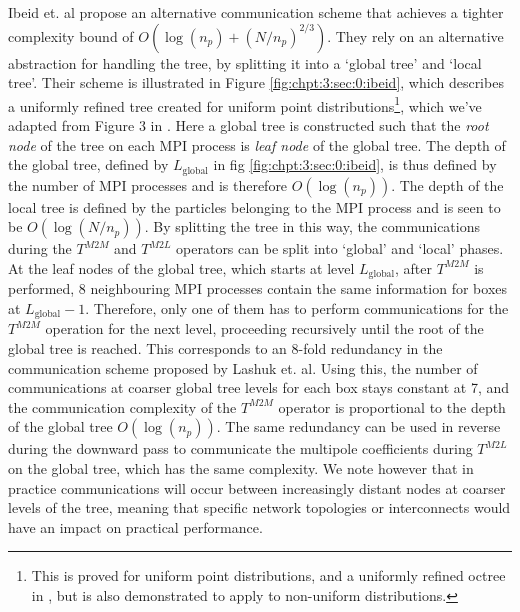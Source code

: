 Ibeid et. al \cite{Ibeid2016} propose an alternative communication scheme that achieves a tighter complexity bound of $O(\log(n_p) + (N/n_p)^{2/3})$. They rely on an alternative abstraction for handling the tree, by splitting it into a `global tree' and `local tree'. Their scheme is illustrated in Figure \ref{fig:chpt:3:sec:0:ibeid}, which describes a uniformly refined tree created for uniform point distributions\footnote{This is proved for uniform point distributions, and a uniformly refined octree in \cite{Ibeid2016}, but is also demonstrated to apply to non-uniform distributions.}, which we've adapted from Figure 3 in \cite{Ibeid2016}. Here a global tree is constructed such that the \textit{root node} of the tree on each MPI process is \textit{leaf node} of the global tree. The depth of the global tree, defined by $L_{\text{global}}$ in fig \ref{fig:chpt:3:sec:0:ibeid}, is thus defined by the number of MPI processes and is therefore $O(\log(n_p))$. The depth of the local tree is defined by the particles belonging to the MPI process and is seen to be $O(\log(N/n_p))$. By splitting the tree in this way, the communications during the $T^{M2M}$ and $T^{M2L}$ operators can be split into `global' and `local' phases. At the leaf nodes of the global tree, which starts at level $L_{\text{global}}$, after $T^{M2M}$ is performed, 8 neighbouring MPI processes contain the same information for boxes at $L_{\text{global}}-1$. Therefore, only one of them has to perform communications for the $T^{M2M}$ operation for the next level, proceeding recursively until the root of the global tree is reached. This corresponds to an 8-fold redundancy in the communication scheme proposed by Lashuk et. al. Using this, the number of communications at coarser global tree levels for each box stays constant at 7, and the communication complexity of the $T^{M2M}$ operator is proportional to the depth of the global tree $O(\log(n_p))$. The same redundancy can be used in reverse during the downward pass to communicate the multipole coefficients during $T^{M2L}$ on the global tree, which has the same complexity. We note however that in practice communications will occur between increasingly distant nodes at coarser levels of the tree, meaning that specific network topologies or interconnects would have an impact on practical performance.

